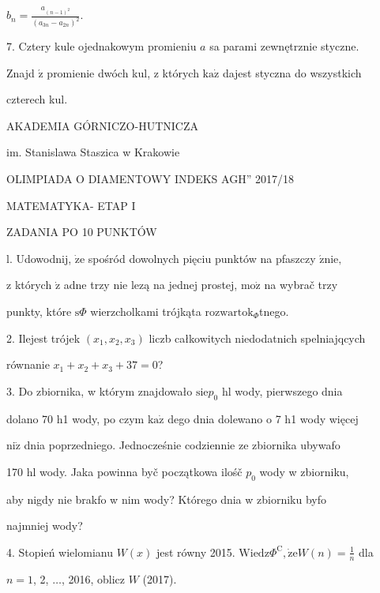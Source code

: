 \documentclass[a4paper,12pt]{article}
\begin{document}
$b_{n}=\displaystyle \frac{a_{(n-1)^{2}}}{(a_{3n}-a_{2n})^{2}}.$

7. Cztery kule ojednakowym promieniu $a$ sa parami zewnętrznie styczne.

Znajd $\acute{\mathrm{z}}$ promienie dwóch kul, z których $\mathrm{k}\mathrm{a}\dot{\mathrm{z}}$ dajest styczna do wszystkich

czterech kul.






AKADEMIA GÓRNICZO-HUTNICZA

im. Stanislawa Staszica w Krakowie

OLIMPIADA O DIAMENTOWY INDEKS AGH'' 2017/18

MATEMATYKA- ETAP I

ZADANIA PO 10 PUNKTÓW

l. Udowodnij, $\dot{\mathrm{z}}\mathrm{e}$ spośród dowolnych pięciu punktów na pfaszczy $\acute{\mathrm{z}}\mathrm{n}\mathrm{i}\mathrm{e},$

z których $\dot{\mathrm{z}}$ adne trzy nie lezą na jednej prostej, $\mathrm{m}\mathrm{o}\dot{\mathrm{z}}$ na wybrač trzy

punkty, które $\mathrm{s}\Phi$ wierzcholkami trójkąta $\mathrm{r}\mathrm{o}\mathrm{z}\mathrm{w}\mathrm{a}\mathrm{r}\mathrm{t}\mathrm{o}\mathrm{k}_{\Phi}$tnego.

2. Ilejest trójek $(x_{1},x_{2},x_{3})$ liczb całkowitych niedodatnich spelniajqcych

równanie $x_{1}+x_{2}+x_{3}+37=0$?

3. Do zbiornika, w którym znajdowało $\mathrm{s}\mathrm{i}\mathrm{e}p_{0}$ hl wody, pierwszego dnia

dolano 70 h1 wody, po czym $\mathrm{k}\mathrm{a}\dot{\mathrm{z}}$ dego dnia dolewano o 7 h1 wody więcej

$\mathrm{n}\mathrm{i}\dot{\mathrm{z}}$ dnia poprzedniego. Jednocześnie codziennie ze zbiornika ubywafo

170 hl wody. Jaka powinna byč początkowa ilośč $p_{0}$ wody w zbiorniku,

aby nigdy nie brakfo w nim wody? Którego dnia w zbiorniku byfo

najmniej wody?

4. Stopień wielomianu $W(x)$ jest równy 2015. $\mathrm{W}\mathrm{i}\mathrm{e}\mathrm{d}\mathrm{z}\Phi^{\mathrm{C}}, \displaystyle \dot{\mathrm{z}}\mathrm{e}W(n)=\frac{1}{n}$ dla

$n=1$, 2, $\ldots$, 2016, oblicz $W$ (2017).
\end{document}
